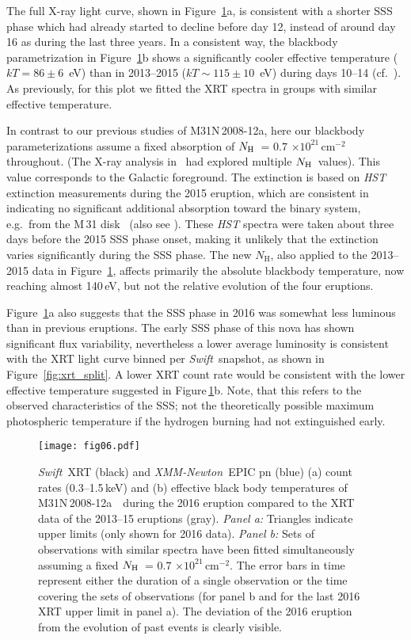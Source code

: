 \documentclass[twocolumn,tighten]{aastex6}
\def\m31{{M\,31}}
\def\swift{{\it Swift~}}
\def\xmm{{\it XMM-Newton~}}
\def\nova{{M31N\,2008-12a~}}
\def\novak{{M31N\,2008-12a}}
\newcommand{\nh}{\hbox{$N_{\rm H}$}~}
\newcommand{\hcm}[1]{$\times 10^{#1}$\,cm$^{-2}$}
\newcommand{\othreek}{\citetalias{2016ApJ...833..149D}}
\newcommand{\hstspec}{\citetalias{2017ApJ...847...35D}}
\begin{document}
The full X-ray light curve, shown in Figure~\ref{fig:xrt_xmm_lc}a, is consistent with a shorter SSS phase which had already started to decline before day 12, instead of around day 16 as during the last three years. In a consistent way, the blackbody parametrization in Figure~\ref{fig:xrt_xmm_lc}b shows a significantly cooler effective temperature ($kT = 86\pm6$~eV) than in 2013--2015 ($kT\sim115\pm10$~eV) during days 10--14 (cf.\ \othreek). As previously, for this plot we fitted the XRT spectra in groups with similar effective temperature.

In contrast to our previous studies of \novak, here our blackbody parameterizations assume a fixed absorption of \nh = $0.7$ \hcm{21} throughout. (The X-ray analysis in \othreek\ had explored multiple \nh values). This value corresponds to the Galactic foreground. The extinction is based on {\it HST} extinction measurements during the 2015 eruption, which are consistent in indicating no significant additional absorption toward the binary system, e.g.\ from the \m31 disk \hstspec\ (also see \othreek). These {\it HST} spectra were taken about three days before the 2015 SSS phase onset, making it unlikely that the extinction varies significantly during the SSS phase. The new $N_\mathrm{H}$, also applied to the 2013--2015 data in Figure~\ref{fig:xrt_xmm_lc}, affects primarily the absolute blackbody temperature, now reaching almost 140\,eV, but not the relative evolution of the four eruptions.

Figure~\ref{fig:xrt_xmm_lc}a also suggests that the SSS phase in 2016 was somewhat less luminous than in previous eruptions. The early SSS phase of this nova has shown significant flux variability, nevertheless a lower average luminosity is consistent with the XRT light curve binned per \swift snapshot, as shown in Figure~\ref{fig:xrt_split}. A lower XRT count rate would be consistent with the lower effective temperature suggested in Figure\,\ref{fig:xrt_xmm_lc}b. Note, that this refers to the observed characteristics of the SSS; not the theoretically possible maximum photospheric temperature if the hydrogen burning had not extinguished early.

\begin{figure}
\texttt{[image: fig06.pdf]}
\caption{\swift XRT (black) and \xmm EPIC pn (blue) (a) count rates (0.3--1.5\,keV) and (b) effective black body temperatures of \nova\ during the 2016 eruption compared to the XRT data of the 2013--15 eruptions (gray). {\it Panel a:} Triangles indicate upper limits (only shown for 2016 data). {\it Panel b:} Sets of observations with similar spectra have been fitted simultaneously assuming a fixed \nh = $0.7$ \hcm{21}. The error bars in time represent either the duration of a single observation or the time covering the sets of observations (for panel b and for the last 2016 XRT upper limit in panel a). The deviation of the 2016 eruption from the evolution of past events is clearly visible.}
\label{fig:xrt_xmm_lc}
\end{figure}
\end{document}
